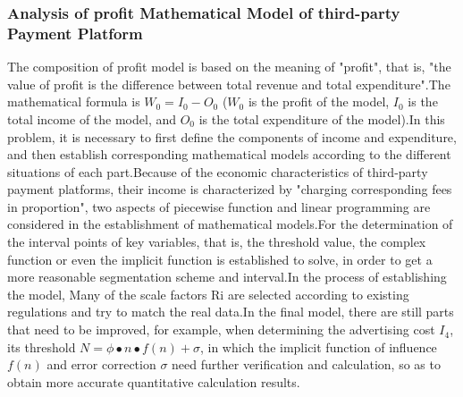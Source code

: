 \documentclass[../mcmpaper]{subfiles}
\begin{document}
\subsubsection{Analysis of profit Mathematical Model of third-party Payment Platform}
The composition of profit model is based on the meaning of "profit", that is, "the value of profit is the difference between total revenue and total expenditure".The mathematical formula is $W_0=I_0-O_0$ ($W_0$ is the profit of the model, $I_0$ is the total income of the model, and $O_0$ is the total expenditure of the model).In this problem, it is necessary to first define the components of income and expenditure, and then establish corresponding mathematical models according to the different situations of each part.Because of the economic characteristics of third-party payment platforms, their income is characterized by "charging corresponding fees in proportion", two aspects of piecewise function and linear programming are considered in the establishment of mathematical models.For the determination of the interval points of key variables, that is, the threshold value, the complex function or even the implicit function is established to solve, in order to get a more reasonable segmentation scheme and interval.In the process of establishing the model, Many of the scale factors Ri are selected according to existing regulations and try to match the real data.In the final model, there are still parts that need to be improved, for example, when determining the advertising cost $I_4$, its threshold $N=\phi\bullet n\bullet f(n)+\sigma$, in which the implicit function of influence $f(n)$ and error correction $\sigma$ need further verification and calculation, so as to obtain more accurate quantitative calculation results.
\end{document}
